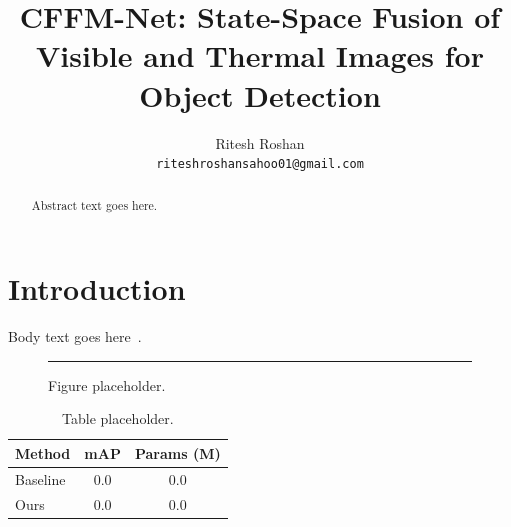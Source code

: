 \documentclass[10pt,twocolumn,letterpaper]{article}
\title{CFFM-Net: State-Space Fusion of Visible and Thermal Images for Object Detection}
\author{Ritesh Roshan\\
{\tt\small riteshroshansahoo01@gmail.com}
}
\begin{document}
\maketitle

\begin{abstract}
  Abstract text goes here.
\end{abstract}

\section{Introduction}
\label{sec:intro}
Body text goes here~\cite{gu2023mamba}.

\begin{figure}[t]
  \centering
  \rule{0.9\linewidth}{4cm}
  \caption{Figure placeholder.}
  \label{fig:placeholder}
\end{figure}

\begin{table}[t]
  \centering
  \begin{tabular}{@{}lcc@{}}
    \toprule
    Method & mAP & Params (M) \\
    \midrule
    Baseline & 0.0 & 0.0 \\
    Ours & 0.0 & 0.0 \\
    \bottomrule
  \end{tabular}
  \caption{Table placeholder.}
  \label{tab:placeholder}
\end{table}

{
  \small
  
  
}
\end{document}
